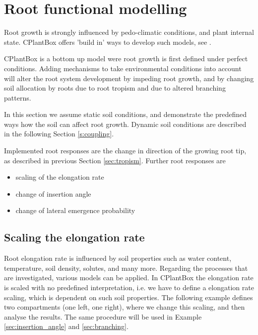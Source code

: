 \newpage
\section{Root functional modelling} \label{sec:functional}

Root growth is strongly influenced by pedo-climatic conditions, and plant internal state. CPlantBox offers 'build in' ways to develop such models, see \cite{schnepf2018crootbox}. 

CPlantBox is a bottom up model were root growth is first defined under perfect conditions. Adding mechanisms to take environmental conditions into account will alter the root system development by impeding root growth, and by changing soil allocation by roots due to root tropism and due to altered branching patterns.

In this section we assume static soil conditions, and demonstrate the predefined ways how the soil can affect root growth.
Dynamic soil conditions are described in the following Section \ref{s:coupling}. 

Implemented root responses are the change in direction of the growing root tip, as described in previous Section \ref{sec:tropism}.
Further root responses are 
\begin{itemize}
 \item scaling of the elongation rate 
 \item change of insertion angle
 \item change of lateral emergence probability
\end{itemize}

\subsection{Scaling the elongation rate} \label{sec:elongation}

Root elongation rate is influenced by soil properties such as water content, temperature, soil density, solutes, and many more. Regarding the processes that are investigated, various models can be applied. In CPlantBox the elongation rate is scaled with no predefined interpretation, i.e. we have to define a elongation rate scaling, which is dependent on such soil properties. The following example defines two compartments (one left, one right), where we change this scaling, and then analyse the results. The same procedure will be used in Example \ref{sec:insertion_angle} and \ref{sec:branching}.




